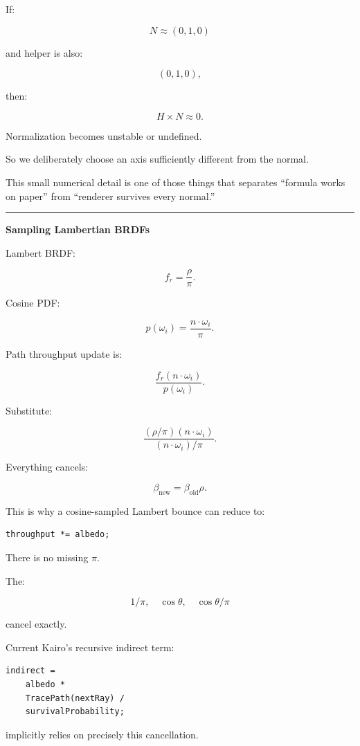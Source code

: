 If:

\[
N\approx(0,1,0)
\]

and helper is also:

\[
(0,1,0),
\]

then:

\[
H\times N\approx0.
\]

Normalization becomes unstable or undefined.

So we deliberately choose an axis sufficiently different from the normal.

This small numerical detail is one of those things that separates ``formula works on paper'' from ``renderer survives every normal.''

\begin{center}\rule{0.5\linewidth}{0.5pt}\end{center}

\textbf{Sampling Lambertian BRDFs}

Lambert BRDF:

\[
f_r=\frac{\rho}{\pi}.
\]

Cosine PDF:

\[
p(\omega_i)
=
\frac{n\cdot\omega_i}{\pi}.
\]

Path throughput update is:

\[
\frac{
f_r
(n\cdot\omega_i)
}{
p(\omega_i)
}.
\]

Substitute:

\[
\frac{
(\rho/\pi)
(n\cdot\omega_i)
}{
(n\cdot\omega_i)/\pi
}.
\]

Everything cancels:

\[
\boxed{
\beta_{\text{new}}
=
\beta_{\text{old}}\rho.
}
\]

This is why a cosine-sampled Lambert bounce can reduce to:

\begin{verbatim}
throughput *= albedo;
\end{verbatim}

There is no missing \(\pi\).

The:

\[
1/\pi,
\quad
\cos\theta,
\quad
\cos\theta/\pi
\]

cancel exactly.

Current Kairo's recursive indirect term:

\begin{verbatim}
indirect =
    albedo *
    TracePath(nextRay) /
    survivalProbability;
\end{verbatim}

implicitly relies on precisely this cancellation.

